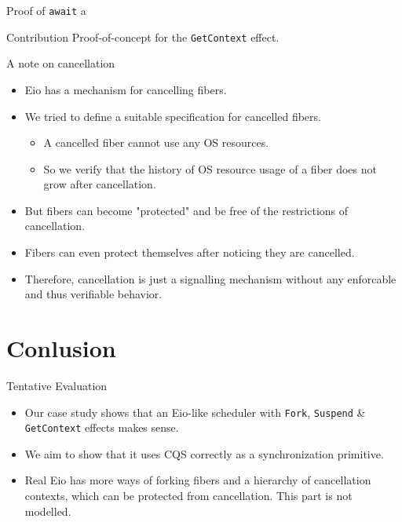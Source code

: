 \documentclass[aspectratio=43]{beamer}
\newcommand{\ocaml}[1]{\texttt{#1}}
\newcommand{\efork}{\ocaml{Fork}}
\newcommand{\esuspend}{\ocaml{Suspend}}
\newcommand{\egetctx}{\ocaml{GetContext}}
\begin{document}
\begin{frame}[fragile]{Proof of \ocaml{await}}
    a
\end{frame}

\begin{frame}{Contribution}
    Proof-of-concept for the \texttt{GetContext} effect.
\end{frame}

\begin{frame}{A note on cancellation}
    \begin{itemize}
        \item Eio has a mechanism for cancelling fibers.
        \item We tried to define a suitable specification for cancelled fibers.
              \begin{itemize}
                  \item A cancelled fiber cannot use any OS resources.
                  \item So we verify that the history of OS resource usage of a fiber does not grow after cancellation.
              \end{itemize}
        \item But fibers can become "protected" and be free of the restrictions of cancellation.
        \item Fibers can even protect themselves after noticing they are cancelled.
        \item Therefore, cancellation is just a signalling mechanism without any enforcable and thus verifiable behavior.
    \end{itemize}
\end{frame}

\section{Conlusion}
\begin{frame}{Tentative Evaluation}
    \begin{itemize}
        \item Our case study shows that an Eio-like scheduler with \efork{}, \esuspend{} \& \egetctx{} effects makes sense.
        \item We aim to show that it uses CQS correctly as a synchronization primitive.
        \item Real Eio has more ways of forking fibers and a hierarchy of cancellation contexts, which can be protected from cancellation. This part is not modelled.
    \end{itemize}
\end{frame}
\end{document}
